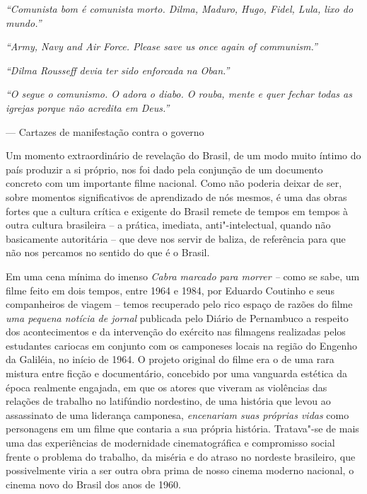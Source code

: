
\begin{flushright}
\begin{minipage}{0.84\textwidth}
\footnotesize
\emph{``Comunista bom é comunista morto. Dilma, Maduro, Hugo, Fidel, Lula,
lixo do mundo.''}

\smallskip
\emph{``Army, Navy and Air Force. Please save us once again of communism.''}

\smallskip
\emph{``Dilma Rousseff devia ter sido enforcada na Oban.''}

\smallskip
\emph{``O  segue o comunismo. O  adora o diabo. O  rouba, mente e quer
fechar todas as igrejas porque não acredita em Deus.''}

\medskip
\hspace*{\fill}--- Cartazes de manifestação contra o governo
\end{minipage}
\end{flushright}

Um momento extraordinário de revelação do Brasil, de um modo muito
íntimo do país produzir a si próprio, nos foi dado pela conjunção de um
documento concreto com um importante filme nacional. Como não poderia
deixar de ser, sobre momentos significativos de aprendizado de nós
mesmos, é uma das obras fortes que a cultura crítica e exigente do
Brasil remete de tempos em tempos à outra cultura brasileira -- a
prática, imediata, anti"-intelectual, quando não basicamente autoritária
-- que deve nos servir de baliza, de referência para que não nos
percamos no sentido do que é o Brasil.

Em uma cena mínima do imenso \emph{Cabra marcado para morrer --} como se
sabe, um filme feito em dois tempos, entre 1964 e 1984, por Eduardo
Coutinho e seus companheiros de viagem -- temos recuperado pelo rico
espaço de razões do filme \emph{uma pequena notícia de jornal} publicada
pelo Diário de Pernambuco a respeito dos acontecimentos e da intervenção
do exército nas filmagens realizadas pelos estudantes cariocas em
conjunto com os camponeses locais na região do Engenho da Galiléia, no
início de 1964. O projeto original do filme era o de uma rara mistura
entre ficção e documentário, concebido por uma vanguarda estética da
época realmente engajada, em que os atores que viveram as violências das
relações de trabalho no latifúndio nordestino, de uma história que levou
ao assassinato de uma liderança camponesa, \emph{encenariam suas
próprias vidas} como personagens em um filme que contaria a sua própria
história. Tratava"-se de mais uma das experiências de modernidade
cinematográfica e compromisso social frente o problema do trabalho, da
miséria e do atraso no nordeste brasileiro, que possivelmente viria a
ser outra obra prima de nosso cinema moderno nacional, o cinema novo do
Brasil dos anos de 1960.

